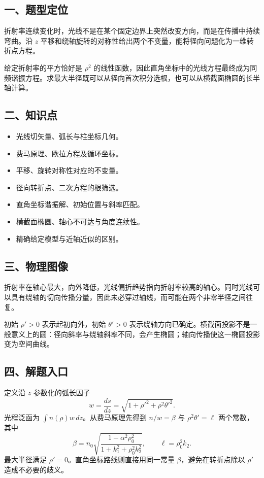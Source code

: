 \documentclass[12pt,a4paper,fontset=fandol]{ctexart}
\providecommand{\tightlist}{\setlength{\itemsep}{0pt}\setlength{\parskip}{0pt}}
\begin{document}
\subsection{一、题型定位}\label{ux4e00ux9898ux578bux5b9aux4f4d-6}

折射率连续变化时，光线不是在某个固定边界上突然改变方向，而是在传播中持续弯曲。沿
\(z\)
平移和绕轴旋转的对称性给出两个不变量，能将径向问题化为一维转折点方程。

给定折射率的平方恰好是 \(\rho^2\)
的线性函数，因此直角坐标中的光线方程最终成为同频谐振方程。求最大半径既可以从径向首次积分选根，也可以从横截面椭圆的长半轴计算。

\subsection{二、知识点}\label{ux4e8cux77e5ux8bc6ux70b9-6}

\begin{itemize}
\tightlist
\item
  光线切矢量、弧长与柱坐标几何。
\item
  费马原理、欧拉方程及循环坐标。
\item
  平移、旋转对称性对应的不变量。
\item
  径向转折点、二次方程的根筛选。
\item
  直角坐标谐振解、初始位置与斜率匹配。
\item
  横截面椭圆、轴心不可达与角度连续性。
\item
  精确给定模型与近轴近似的区别。
\end{itemize}

\subsection{三、物理图像}\label{ux4e09ux7269ux7406ux56feux50cf-6}

折射率在轴心最大，向外降低，光线偏折趋势指向折射率较高的轴心。同时光线可以具有绕轴的切向传播分量，因此未必穿过轴线，而可能在两个非零半径之间往复。

初始 \(\rho'>0\) 表示起初向外，初始 \(\theta'>0\)
表示绕轴方向已确定。横截面投影不是一般意义上的圆：径向斜率与绕轴斜率不同，会产生椭圆；轴向传播使这一椭圆投影变为空间曲线。

\subsection{四、解题入口}\label{ux56dbux89e3ux9898ux5165ux53e3-6}

定义沿 \(z\) 参数化的弧长因子 \[
w=\frac{ds}{dz}=\sqrt{1+\rho'^2+\rho^2\theta'^2}.
\] 光程泛函为 \(\int n(\rho)w\,dz\)。从费马原理先得到 \(n/w=\beta\) 与
\(\rho^2\theta'=\ell\) 两个常数，其中 \[
\beta=n_0\sqrt{\frac{1-\alpha^2\rho_0^2}
{1+k_1^2+\rho_0^2k_2^2}},\qquad
\ell=\rho_0^2k_2.
\] 最大半径满足 \(\rho'=0\)。直角坐标路线则直接用同一常量
\(\beta\)，避免在转折点除以 \(\rho'\) 造成不必要的歧义。
\end{document}
